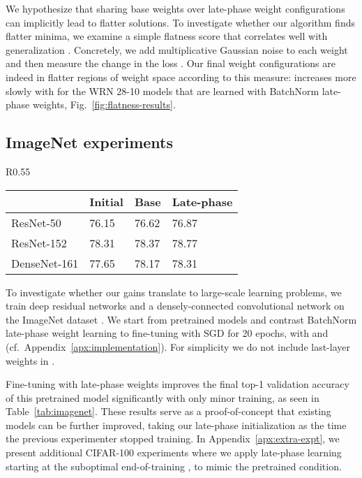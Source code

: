 \documentclass{article} \usepackage{iclr2021_conference,times}
\begin{document}
We hypothesize that sharing base weights over  late-phase weight configurations can implicitly lead to flatter solutions. To investigate whether our algorithm finds flatter minima, we examine a simple flatness score that correlates well with generalization \citep{pittorino_entropic_2020,jiang_fantastic_2020}. Concretely, we add multiplicative Gaussian noise  to each weight  and then measure the change in the loss
. Our final weight configurations are indeed in flatter regions of weight space according to this measure:  increases more slowly with  for the WRN 28-10 models that are learned with BatchNorm late-phase weights, Fig.~\ref{fig:flatness-results}.


\subsection{ImageNet experiments}
\setlength\intextsep{0pt}
\begin{wraptable}[10]{R}{0.55\textwidth}
\vspace{-0.05cm}
\centering
  \caption{Validation set acc.~(\%) on ImageNet. Mean  std.~over 5 seeds. BatchNorm late-phase and baseline trained for 20 epochs with SGD.}
  \label{tab:imagenet}
\begin{tabular}{llll}
\toprule
           & Initial & Base & Late-phase \\\midrule
ResNet-50  & 76.15 & 76.62 & 76.87 \\
ResNet-152  & 78.31 & 78.37 & 78.77 \\
DenseNet-161  & 77.65 & 78.17 & 78.31 \\
\midrule
\end{tabular}
\end{wraptable}
To investigate whether our gains translate to large-scale learning problems, we train deep residual networks \citep{he_deep_2016} and a densely-connected convolutional network \citep[DenseNet;][]{huang_densely_2018} on the ImageNet dataset \citep{russakovsky_imagenet_2015}. We start from pretrained models and contrast BatchNorm late-phase weight learning to fine-tuning with SGD for 20 epochs, with  and  (cf.~Appendix~\ref{apx:implementation}). For simplicity we do not include last-layer weights in .


Fine-tuning with late-phase weights improves the final top-1 validation accuracy of this pretrained model significantly with only minor training, as seen in Table~\ref{tab:imagenet}. These results serve as a proof-of-concept that existing models can be further improved, taking our late-phase initialization  as the time the previous experimenter stopped training. In Appendix~\ref{apx:extra-expt}, we present additional CIFAR-100 experiments where we apply late-phase learning starting at the suboptimal end-of-training , to mimic the pretrained condition.
\end{document}
